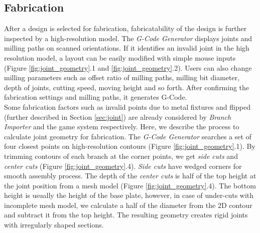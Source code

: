 \subsection{Fabrication}
\label{sec:fabrication}
After a design is selected for fabrication, fabricatability of the design is further inspected by a high-resolution model.
The \textit{G-Code Generator} displays joints and milling paths on scanned orientations.
If it identifies an invalid joint in the high resolution model, a layout can be easily modified with simple mouse inputs (Figure \ref{fig:joint_geometry}.1 and \ref{fig:joint_geometry}.2).
Users can also change milling parameters such as offset ratio of milling paths, milling bit diameter, depth of joints, cutting speed, moving height and so forth.
After confirming the fabrication settings and milling paths, it generates G-Code.\\

Some fabrication factors such as invalid points due to metal fixtures and flipped (further described in Section \ref{sec:joint}) are already considered by \textit{Branch Importer} and the game system respectively.
Here, we describe the process to calculate joint geometry for fabrication.
The \textit{G-Code Generator} searches a set of four closest points on high-resolution contours (Figure \ref{fig:joint_geometry}.1).
By trimming contours of each branch at the corner points, we get \textit{side cuts} and \textit{center cuts} (Figure \ref{fig:joint_geometry}.4).
\textit{Side cuts} have wedged corners for smooth assembly process.
The depth of the \textit{center cuts} is half of the top height at the joint position from a mesh model (Figure \ref{fig:joint_geometry}.4).
The bottom height is usually the height of the base plate, however, in case of under-cuts with incomplete mesh model, we calculate a half of the diameter from the 2D contour and subtract it from the top height.
The resulting geometry creates rigid joints with irregularly shaped sections.



